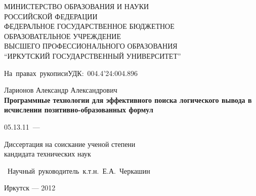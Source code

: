 \documentclass[a4paper]{report}
\begin{document}
\begin{titlepage}
\begin{center}
МИНИСТЕРСТВО ОБРАЗОВАНИЯ И НАУКИ \\
РОССИЙСКОЙ ФЕДЕРАЦИИ \\
ФЕДЕРАЛЬНОЕ ГОСУДАРСТВЕННОЕ БЮДЖЕТНОЕ \\
ОБРАЗОВАТЕЛЬНОЕ УЧРЕЖДЕНИЕ \\
ВЫСШЕГО ПРОФЕССИОНАЛЬНОГО ОБРАЗОВАНИЯ\\
``ИРКУТСКИЙ ГОСУДАРСТВЕННЫЙ УНИВЕРСИТЕТ''
\end{center}
\vspace{1cm}
\hfill{\vbox{\hbox{На правах рукописи}\hbox{\hfill УДК: 004.4'24:004.896}}}
\vspace{1cm}
\begin{center}
    Ларионов Александр Александрович \\
    \vspace{0.5cm}
{\bf Программные технологии для эффективного поиска логического вывода в исчислении позитивно-образованных формул}
\end{center}
\vfill
\hfil\hbox{\hbox{05.13.11 --- }
    \hbox{}%
}\hfil
\vspace{1cm}
\begin{center}
    Диссертация на соискание ученой степени \\
    кандидата технических наук
\end{center}
\vfill
\hfill\hbox{\vbox{
    \hbox{Научный руководитель}
    \hbox{к.т.н.~Е.А.~Черкашин}
}}%
\vfill
\begin{center}
{Иркутск --- 2012}
\end{center}
\end{titlepage}

%
\def\namepc{\hbox{$\rm\mu{}$PrISM}}

\newpage

\tableofcontents

\newpage









\label{pg:main}

\label{pg:total}
\end{document}
